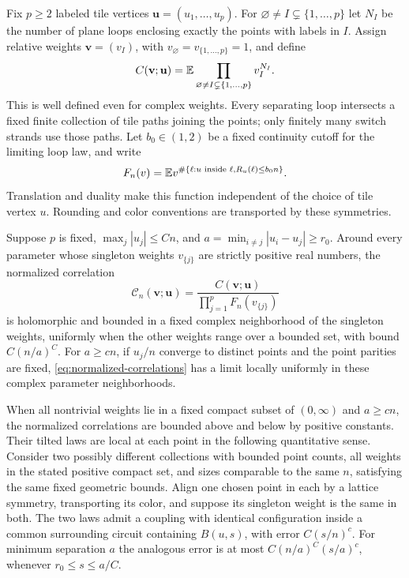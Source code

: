 Fix $p\ge2$ labeled tile vertices $\mathbf u=(u_1,\ldots,u_p)$.
For $\varnothing\ne I\subsetneq\{1,\ldots,p\}$ let $N_I$ be the number of plane loops
enclosing exactly the points with labels in $I$. Assign relative
weights $\mathbf v=(v_I)$, with $v_\varnothing=v_{\{1,\ldots,p\}}=1$,
and define
\[
 C(\mathbf v;\mathbf u)
       =\mathbb E\prod_{\varnothing\ne I\subsetneq\{1,\ldots,p\}}
                       v_I^{N_I}.
\]
This is well defined even for complex weights. Every separating loop
intersects a fixed finite collection of tile paths joining the points;
only finitely many switch strands use those paths. Let $b_0\in(1,2)$
be a fixed continuity cutoff for the limiting loop law, and write
\[
 F_n(v)=\mathbb E v^{\#\{\ell:u\text{ inside }\ell, R_u(\ell)\le b_0n\}}.
\]
Translation and duality make this function independent of the choice
of tile vertex $u$. Rounding and color conventions are transported
by these symmetries.

\begin{proposition}
\label{prop:normalization}
Suppose $p$ is fixed, $\max_j|u_j|\le Cn$, and
$a=\min_{i\ne j}|u_i-u_j|\ge r_0$. Around every parameter whose
singleton weights $v_{\{j\}}$ are strictly positive real numbers,
the normalized correlation
\begin{equation}\label{eq:normalized-correlations}
 \mathcal C_n(\mathbf v;\mathbf u)
   =\frac{C(\mathbf v;\mathbf u)}
          {\prod_{j=1}^p F_n(v_{\{j\}})}
\end{equation}
is holomorphic and bounded in a fixed complex neighborhood of the
singleton weights, uniformly when the other weights range over a
bounded set, with bound $C(n/a)^C$. For $a\ge cn$, if $u_j/n$ converge
to distinct points and the point parities are fixed,
\eqref{eq:normalized-correlations} has a limit locally uniformly in
these complex parameter neighborhoods.

When all nontrivial weights lie in a fixed compact subset of
$(0,\infty)$ and $a\ge cn$, the normalized correlations are bounded
above and below by positive constants. Their tilted laws are local
at each point in the following quantitative sense. Consider two
possibly different collections with bounded point counts, all weights
in the stated positive compact set, and sizes comparable to the
same $n$, satisfying the same fixed geometric bounds. Align one
chosen point in each by a lattice symmetry, transporting its color,
and suppose its singleton weight is the same in both. The two laws admit
a coupling with identical configuration inside a common surrounding
circuit containing $B(u,s)$, with error $C(s/n)^c$. For minimum
separation $a$ the analogous error is at most
$C(n/a)^C(s/a)^c$, whenever $r_0\le s\le a/C$.
\end{proposition}

